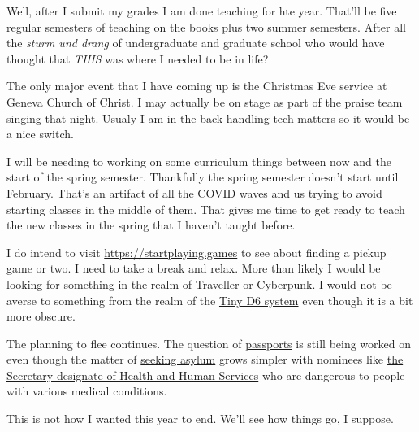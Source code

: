 Well, after I submit my grades I am done teaching for hte year. That'll
be five regular semesters of teaching on the books plus two summer
semesters. After all the \emph{sturm und drang} of undergraduate and
graduate school who would have thought that \emph{THIS} was where I
needed to be in life?

The only major event that I have coming up is the Christmas Eve service
at Geneva Church of Christ. I may actually be on stage as part of the
praise team singing that night. Usualy I am in the back handling tech
matters so it would be a nice switch.

I will be needing to working on some curriculum things between now and
the start of the spring semester. Thankfully the spring semester doesn't
start until February. That's an artifact of all the COVID waves and us
trying to avoid starting classes in the middle of them. That gives me
time to get ready to teach the new classes in the spring that I haven't
taught before.

I do intend to visit \url{https://startplaying.games} to see about
finding a pickup game or two. I need to take a break and relax. More
than likely I would be looking for something in the realm of
\href{https://startplaying.games/search?gameSystems=traveller}{Traveller}
or
\href{https://startplaying.games/search?gameSystems=cyberpunk-2020&gameSystems=cyberpunk-red}{Cyberpunk}.
I would not be averse to something from the realm of the
\href{https://startplaying.games/search?gameSystems=tiny-cthulhu&gameSystems=tiny-dungeon&gameSystems=tiny-supers}{Tiny
D6 system} even though it is a bit more obscure.

The planning to flee continues. The question of
\href{https://simple.wikipedia.org/w/index.php?title=Passport&oldid=9380185}{passports}
is still being worked on even though the matter of
\href{https://simple.wikipedia.org/w/index.php?title=Convention_Relating_to_the_Status_of_Refugees&oldid=9477226}{seeking
asylum} grows simpler with nominees like
\href{https://simple.wikipedia.org/w/index.php?title=Robert_F._Kennedy_Jr.&oldid=9916838}{the
Secretary-designate of Health and Human Services} who are dangerous to
people with various medical conditions.

This is not how I wanted this year to end. We'll see how things go, I
suppose.
